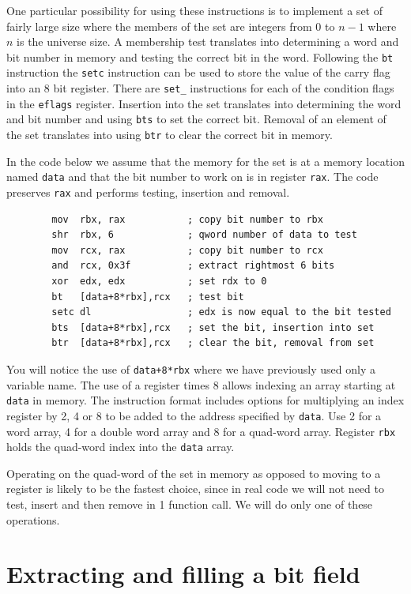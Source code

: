 \documentclass[11pt,b5paper]{book}
\begin{document}
One particular possibility for using these instructions is to implement a set 
of fairly large size where the members of the set are integers from 0 to $n-1$
where $n$ is the universe size.
A membership test translates into determining a word and bit number in memory
and testing the correct bit in the word.
Following the {\tt bt} instruction the {\tt setc} instruction can be used to
store the value of the carry flag into an 8 bit register.
There are {\tt set\_} instructions for each of the condition flags in the
{\tt eflags} register.
Insertion into the set translates into determining the word and bit number and
using {\tt bts} to set the correct bit.
Removal of an element of the set translates into using {\tt btr} to clear the
correct bit in memory.

In the code below we assume that the memory for the set is at a memory
location named {\tt data} and that the bit number to work on is in register
{\tt rax}.
The code preserves {\tt rax} and performs testing, insertion and removal.

\begin{verbatim}
        mov  rbx, rax           ; copy bit number to rbx
        shr  rbx, 6             ; qword number of data to test
        mov  rcx, rax           ; copy bit number to rcx
        and  rcx, 0x3f          ; extract rightmost 6 bits
        xor  edx, edx           ; set rdx to 0
        bt   [data+8*rbx],rcx   ; test bit
        setc dl                 ; edx is now equal to the bit tested
        bts  [data+8*rbx],rcx   ; set the bit, insertion into set
        btr  [data+8*rbx],rcx   ; clear the bit, removal from set
\end{verbatim}

You will notice the use of {\tt data+8*rbx} where we have previously used only
a variable name.  The use of a register times 8 allows indexing an array
starting at {\tt data} in memory.
The instruction format includes options for multiplying an index register by
2, 4 or 8 to be added to the address specified by {\tt data}.
Use 2 for a word array, 4 for a double word array and 8 for a quad-word array.
Register {\tt rbx} holds the quad-word index into the {\tt data} array.

Operating on the quad-word of the set in memory as opposed to moving to
a register is likely to be the fastest choice, since in real code we will not
need to test, insert and then remove in 1 function call.
We will do only one of these operations.

\section{Extracting and filling a bit field}
\end{document}
